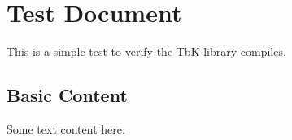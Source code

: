 \documentclass{article}
\begin{document}
\section{Test Document}

This is a simple test to verify the TbK library compiles.

\subsection{Basic Content}

Some text content here.
\end{document}
